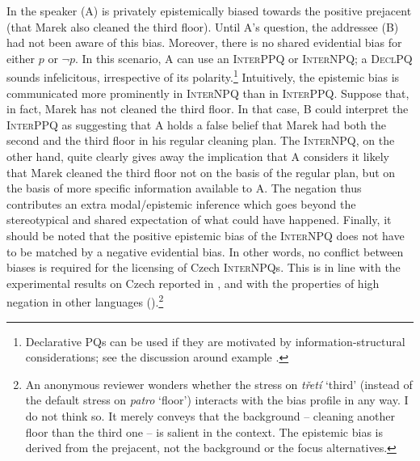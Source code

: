 \documentclass[output=paper,colorlinks,citecolor=brown]{langscibook}
\begin{document}
\noindent In  the speaker (A) is privately epistemically biased 
towards the positive prejacent (that Marek also cleaned the third floor). Until A's question, the addressee (B) had not been aware of this bias. Moreover, there is no shared evidential bias for either $p$ or $\neg p$. In this scenario, A can use an \textsc{InterPPQ} or \textsc{InterNPQ}; a \textsc{DeclPQ} sounds infelicitous, irrespective of its polarity.\footnote{Declarative PQs can be used if they are motivated by information-structural considerations; see the discussion around example .} Intuitively, the epistemic bias is communicated more prominently in \textsc{InterNPQ} than in \textsc{InterPPQ}. Suppose that, in fact, Marek has not cleaned the third floor. In that case, B could interpret the \textsc{InterPPQ} as suggesting that A holds a false belief that Marek had both the second and the third floor in his regular cleaning plan. The \textsc{InterNPQ}, on the other hand, quite clearly gives away the implication that A considers it likely that Marek cleaned the third floor not on the basis of the regular plan, but on the basis of more specific information available to A. The negation thus contributes an extra modal/epistemic inference which goes beyond the stereotypical and shared expectation of what could have happened. Finally, it should be noted that the positive epistemic bias of the \textsc{InterNPQ} does not have to be matched by a negative evidential bias. In other words, no conflict between biases is required for the licensing of Czech \textsc{InterNPQ}s. This is in line with the experimental results on Czech reported in \citet{Stankova2023}, and with the properties of high negation in other languages (\citealt{Ladd1981,Buring.Gunlogson2000,Romero.Han2004,Hartung2009,Gyuris2017,Domaneschi.etal2017}).\footnote{An anonymous reviewer wonders whether the stress on \textit{třetí} `third' (instead of the default stress on \textit{patro} `floor') interacts with the bias profile in any way. I do not think so. It merely conveys that the background -- cleaning another floor than the third one -- is salient in the context. The epistemic bias is derived from the prejacent, not the background or the focus alternatives.}
\end{document}
